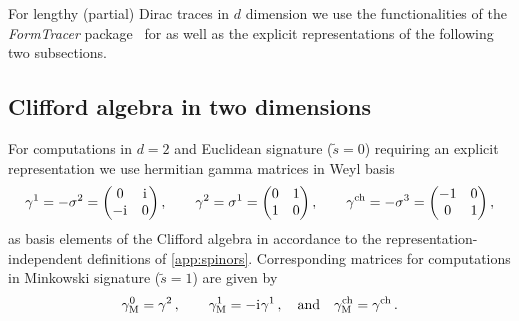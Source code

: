 For lengthy (partial) Dirac traces in $d$ dimension we use the functionalities of the \textit{FormTracer} package~\cite{Cyrol:2016zqb,Cyrol:2021} for \WAMwR{} as well as the explicit representations of the following two subsections.

\subsection{Clifford algebra in two dimensions}\label{app:clifford2}
For computations in $d=2$ and Euclidean signature ($\tilde{s}=0$) requiring an explicit representation we use hermitian gamma matrices in Weyl basis
\begin{align}
	\gamma^1= -\sigma^2 = \begin{pmatrix}
		0& \iu \\
		-\iu &0
	\end{pmatrix},\qquad%
	\gamma^2= \sigma^1 = \begin{pmatrix}
		0& 1\\
		1 &0
	\end{pmatrix},\qquad%
	\gammach=-\sigma^3=\begin{pmatrix}
		-1& 0\\
		0 &1
	\end{pmatrix},\label{eq:gammaWeyl2}
\end{align}
as basis elements of the Clifford algebra in accordance to the representation-independent definitions of \cref{app:spinors}.
Corresponding matrices for computations in Minkowski signature ($\tilde{s}=1$) are given by
\begin{align}
	\gamma_\mathrm{M}^0 = \gamma^2 \, ,\qquad \gamma_\mathrm{M}^1 = -\mathrm{i}\mkern1mu \gamma^1 \, , \quad\text{and}\quad \gamma^{\mathrm{ch}}_\mathrm{M}=\gamma^{\mathrm{ch}} \, .
\end{align}

